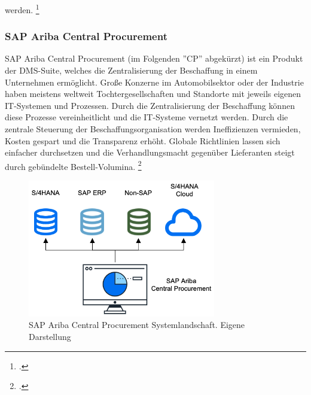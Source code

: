 werden. \footcite[Vgl.][]{theorie_sap_contract_price_renegotiation_2024}

\subsubsection{SAP Ariba Central Procurement}

SAP Ariba Central Procurement (im Folgenden ''CP'' abgekürzt) ist ein Produkt der DMS-Suite, welches die Zentralisierung der Beschaffung in einem Unternehmen ermöglicht. Gro\ss e Konzerne im Automobilsektor oder der Industrie haben meistens weltweit Tochtergesellschaften und Standorte mit jeweils eigenen IT-Systemen und Prozessen. Durch die Zentralisierung der Beschaffung können diese Prozesse vereinheitlicht und die IT-Systeme vernetzt werden. Durch die zentrale Steuerung der Beschaffungsorganisation werden Ineffizienzen vermieden, Kosten gespart und die Transparenz erhöht. Globale Richtlinien lassen sich einfacher durchsetzen und die Verhandlungsmacht gegenüber Lieferanten steigt durch gebündelte Bestell-Volumina. \footcite[Vgl.][]{theorie_sap_central_procurement_overview_2024}

\begin{figure}[H]
    \centering
    \includegraphics[height=6cm]{Bilder/Central_Procurement_System_Landscape.png}
    \caption[SAP Ariba Central Procurement Systemlandschaft]{SAP Ariba Central Procurement Systemlandschaft. Eigene Darstellung}
    \label{fig:Central_Procurement_System_Landscape}
\end{figure}

